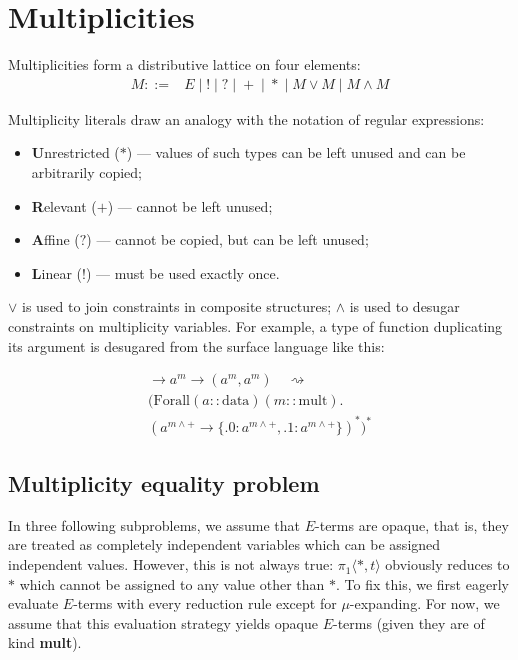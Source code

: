 \documentclass[a4paper,14pt]{extreport}
\begin{document}
\section{Multiplicities}

Multiplicities form a distributive lattice on four elements:
\[
    \begin{array}{rl}
        M ::=& E \;|\; ! \;|\; ? \;|\; + \;|\; * \;|\; M \lor M
            \;|\; M \land M
    \end{array}
\]

Multiplicity literals draw an analogy with the notation of regular expressions:

\begin{itemize}
    \item \textbf{U}nrestricted ($*$) --- values of such types can be left
        unused and can be arbitrarily copied;
    \item \textbf{R}elevant ($+$) --- cannot be left unused;
    \item \textbf{A}ffine ($?$) --- cannot be copied, but can be left unused;
    \item \textbf{L}inear ($!$) --- must be used exactly once.
\end{itemize}

$\lor$ is used to join constraints in composite structures; $\land$ is used to
desugar constraints on multiplicity variables. For example, a type of function
duplicating its argument is desugared from the surface language like this:

\begin{multline}
    [m \le +] \to a^m \to (a^m, a^m) \quad\rightsquigarrow\\
    \big(\text{Forall} (a :: \text{data}) (m :: \text{mult}) .\\
    (a^{m \land +} \to \{.0: a^{m \land +}, .1: a^{m \land +}\})^*\big)^*
\end{multline}

\subsection{Multiplicity equality problem}

In three following subproblems, we assume that $E$-terms are opaque, that is,
they are treated as completely independent variables which can be assigned
independent values. However, this is not always true:
$\pi_1 \langle *, t \rangle$ obviously reduces to $*$ which cannot be assigned
to any value other than $*$. To fix this, we first eagerly evaluate $E$-terms
with every reduction rule except for $\mu$-expanding. For now, we assume that
this evaluation strategy yields opaque $E$-terms (given they are of kind
\textbf{mult}).
\end{document}
